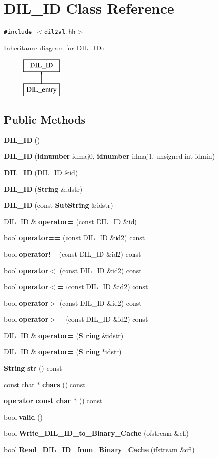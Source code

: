 \section{DIL\_\-ID  Class Reference}
\label{classDIL__ID}
{\tt \#include $<$dil2al.hh$>$}

Inheritance diagram for DIL\_\-ID::\begin{figure}[H]
\begin{center}
\leavevmode
\includegraphics[height=2cm]{classDIL__ID}
\end{center}
\end{figure}
\subsection*{Public Methods}
\begin{CompactItemize}
\item 
{\bf DIL\_\-ID} ()
\item 
{\bf DIL\_\-ID} ({\bf idnumber} idmaj0, {\bf idnumber} idmaj1, unsigned int idmin)
\item 
{\bf DIL\_\-ID} (DIL\_\-ID \&id)
\item 
{\bf DIL\_\-ID} ({\bf String} \&idstr)
\item 
{\bf DIL\_\-ID} (const {\bf Sub\-String} \&idstr)
\item 
DIL\_\-ID \& {\bf operator=} (const DIL\_\-ID \&id)
\item 
bool {\bf operator==} (const DIL\_\-ID \&id2) const
\item 
bool {\bf operator!=} (const DIL\_\-ID \&id2) const
\item 
bool {\bf operator$<$} (const DIL\_\-ID \&id2) const
\item 
bool {\bf operator$<$=} (const DIL\_\-ID \&id2) const
\item 
bool {\bf operator$>$} (const DIL\_\-ID \&id2) const
\item 
bool {\bf operator$>$=} (const DIL\_\-ID \&id2) const
\item 
DIL\_\-ID \& {\bf operator=} ({\bf String} \&idstr)
\item 
DIL\_\-ID \& {\bf operator=} ({\bf String} $\ast$idstr)
\item 
{\bf String} {\bf str} () const
\item 
const char $\ast$ {\bf chars} () const
\item 
{\bf operator const char $\ast$} () const
\item 
bool {\bf valid} ()
\item 
bool {\bf Write\_\-DIL\_\-ID\_\-to\_\-Binary\_\-Cache} (ofstream \&cfl)
\item 
bool {\bf Read\_\-DIL\_\-ID\_\-from\_\-Binary\_\-Cache} (ifstream \&cfl)
\end{CompactItemize}
